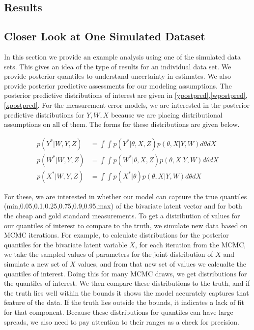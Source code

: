 \documentclass[11pt]{article}\usepackage[]{graphicx}\usepackage[]{color}
\begin{document}
\subsection{Results}


\subsection{Closer Look at One Simulated Dataset}
 
In this section we provide an example analysis using one of the simulated data sets. This gives an idea of the type of results for an individual data set. We provide posterior quantiles to understand uncertainty in estimates. We also provide posterior predictive assessments for our modeling assumptions.  The posterior predictive distributions of interest are given in \eqref{ypostpred},\eqref{wpostpred},\eqref{xpostpred}. For the measurement error models, we are interested in the posterior predictive distributions for $Y,W,X$ because we are placing distributional assumptions on all of them. The forms for these distributions are given below.
  
\begin{align}
  \label{ypostpred}
  p(Y^*|W,Y,Z) &= \int \int p(Y^*|\theta,X,Z) p(\theta, X|Y,W) d\theta dX \\
  \label{wpostpred}
  p(W^*|W,Y,Z) &= \int \int p(W^*|\theta,X,Z) p(\theta, X|Y,W) d\theta dX \\
  \label{xpostpred}
  p(X^*|W,Y,Z) &= \int \int p(X^*|\theta) p(\theta, X|Y,W) d\theta dX
\end{align}


For these, we are interested in whether our model can capture the true quantiles (min,0.05,0.1,0.25,0.75,0.9,0.95,max) of the bivariate latent vector and for both the cheap and gold standard measurements. To get a distribution of values for our quantiles of interest to compare to the truth, we simulate new data based on MCMC iterations. For example, to calculate distributions for the posterior quantiles for the bivariate latent variable $X$, for each iteration from the MCMC, we  take the sampled values of parameters for the joint distribution of $X$ and simulate a new set of $X$ values, and from that new set of values we calcualte the quantiles of interest. Doing this for many MCMC draws, we get distributions for the quantiles of interest. We then compare these distributions to the truth, and if the truth lies well within the bounds it shows the model accurately captures that feature of the data. If the truth lies outside the bounds, it indicates a lack of fit for that component. Because these distributions for quantiles can have large spreads, we also need to pay attention to their ranges as a check for precision.
\end{document}
